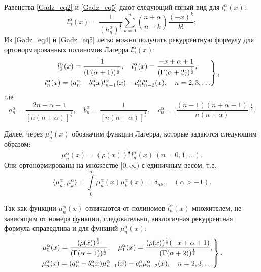 Равенства \eqref{Gadz_eq2} и \eqref{Gadz_eq5} дают следующий явный вид для $l^{\alpha}_{n}(x)$:
\begin{equation}\label{Gadz_eq6}
l_n^\alpha(x) =\frac{1}{(h^{\alpha}_n)^{\frac{1}{2}}}
\sum\limits_{k=0}^{n}\binom{n+\alpha}{n-k}\frac{(-x)^k}{k!};
\end{equation}
Из \eqref{Gadz_eq4} и \eqref{Gadz_eq5} легко можно получить рекуррентную формулу для ортонормированных полиномов Лагерра $l_n^\alpha(x)$:
\begin{equation}\label{Gadz_eq7}
\left.\begin{gathered}
l_{0}^{\alpha}(x)=\frac{1}{(\Gamma(\alpha+1))^{1\over2}}, \quad l_1^{\alpha}(x)=\frac{-x+\alpha+1}{(\Gamma(\alpha+2))^{1\over2}},\\
l_n^{\alpha}(x)=(a_n^\alpha-b_n^\alpha x)l_{n-1}^{\alpha}(x)-c_n^\alpha l_{n-2}^{\alpha}(x), \quad n=2, 3, \ldots
\end{gathered}\right\},
\end{equation}
где
\begin{equation*}
a_n^\alpha=\frac{2n+\alpha-1}{[n(n+\alpha)]^\frac{1}{2}},\quad
b_n^\alpha=\frac{1}{[n(n+\alpha)]^\frac{1}{2}},\quad
c_n^\alpha=\Big[\frac{(n-1)(n+\alpha-1)}{n(n+\alpha)}\Big]^\frac{1}{2}.
\end{equation*}

Далее, через $\mu_n^\alpha(x)$ обозначим функции Лагерра, которые задаются следующим образом:
\begin{equation}\label{funcLag}
\mu_n^\alpha(x)=(\rho(x))^\frac12l_n^\alpha(x)\ (n=0, 1, \ldots).
\end{equation}
Они ортонормированы на множестве $[0, \infty)$ с единичным весом, т.е.
\begin{equation*}
\langle \mu_n^\alpha, \mu_k^\alpha \rangle=\int\limits_0^\infty \mu_n^\alpha(x)\mu_k^\alpha(x)=\delta_{nk}, \quad (\alpha>-1).
\end{equation*}

Так как функции $\mu_n^\alpha(x)$ отличаются от полиномов $l_n^\alpha(x)$ множителем, не зависящим от номера функции, следовательно, аналогичная рекуррентная формула справедлива и для функций $\mu_n^\alpha(x)$:
\begin{equation*}
\left.\begin{gathered}
\mu_{0}^{\alpha}(x)=\frac{(\rho(x))^{1\over2}}{(\Gamma(\alpha+1))^{1\over2}}, \quad \mu_1^{\alpha}(x)=\frac{(\rho(x))^{1\over2}(-x+\alpha+1)}{(\Gamma(\alpha+2))^{1\over2}},\\
\mu_n^{\alpha}(x)=(a_n^\alpha-b_n^\alpha x)\mu_{n-1}^{\alpha}(x)-c_n^\alpha \mu_{n-2}^{\alpha}(x), \quad n=2, 3, \ldots
\end{gathered}\right\}.
\end{equation*}

